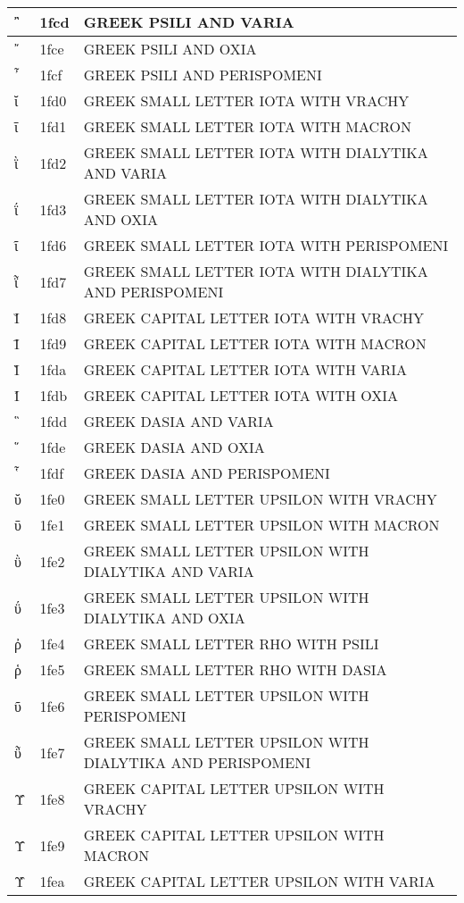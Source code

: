 \documentclass[12pt,letterpaper,openany]{book}
\begin{document}
\begin{center}
\begin{supertabular}{|m{0.25in}|m{0.5in}|m{4in}|}
῍ & 1fcd & GREEK PSILI AND VARIA\\\hline
῎ & 1fce & GREEK PSILI AND OXIA\\\hline
῏ & 1fcf & GREEK PSILI AND PERISPOMENI\\\hline
ῐ & 1fd0 & GREEK SMALL LETTER IOTA WITH VRACHY\\\hline
ῑ & 1fd1 & GREEK SMALL LETTER IOTA WITH MACRON\\\hline
ῒ & 1fd2 & GREEK SMALL LETTER IOTA WITH DIALYTIKA AND VARIA\\\hline
ΐ & 1fd3 & GREEK SMALL LETTER IOTA WITH DIALYTIKA AND OXIA\\\hline
ῖ & 1fd6 & GREEK SMALL LETTER IOTA WITH PERISPOMENI\\\hline
ῗ & 1fd7 & GREEK SMALL LETTER IOTA WITH DIALYTIKA AND PERISPOMENI\\\hline
Ῐ & 1fd8 & GREEK CAPITAL LETTER IOTA WITH VRACHY\\\hline
Ῑ & 1fd9 & GREEK CAPITAL LETTER IOTA WITH MACRON\\\hline
Ὶ & 1fda & GREEK CAPITAL LETTER IOTA WITH VARIA\\\hline
Ί & 1fdb & GREEK CAPITAL LETTER IOTA WITH OXIA\\\hline
῝ & 1fdd & GREEK DASIA AND VARIA\\\hline
῞ & 1fde & GREEK DASIA AND OXIA\\\hline
῟ & 1fdf & GREEK DASIA AND PERISPOMENI\\\hline
ῠ & 1fe0 & GREEK SMALL LETTER UPSILON WITH VRACHY\\\hline
ῡ & 1fe1 & GREEK SMALL LETTER UPSILON WITH MACRON\\\hline
ῢ & 1fe2 & GREEK SMALL LETTER UPSILON WITH DIALYTIKA AND VARIA\\\hline
ΰ & 1fe3 & GREEK SMALL LETTER UPSILON WITH DIALYTIKA AND OXIA\\\hline
ῤ & 1fe4 & GREEK SMALL LETTER RHO WITH PSILI\\\hline
ῥ & 1fe5 & GREEK SMALL LETTER RHO WITH DASIA\\\hline
ῦ & 1fe6 & GREEK SMALL LETTER UPSILON WITH PERISPOMENI\\\hline
ῧ & 1fe7 & GREEK SMALL LETTER UPSILON WITH DIALYTIKA AND PERISPOMENI\\\hline
Ῠ & 1fe8 & GREEK CAPITAL LETTER UPSILON WITH VRACHY\\\hline
Ῡ & 1fe9 & GREEK CAPITAL LETTER UPSILON WITH MACRON\\\hline
Ὺ & 1fea & GREEK CAPITAL LETTER UPSILON WITH VARIA\\\hline

\end{supertabular}
\end{center}
\end{document}
